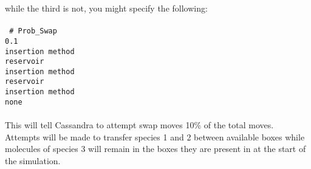 while the third is not, you might specify the following: \\ \\
%
\texttt{ \# Prob\_Swap\\
0.1 \\ 
insertion method \\
reservoir \\
insertion method \\
reservoir \\
insertion method \\
none \\ \\
}
%
This will tell Cassandra to attempt swap moves 10\% of the total moves. Attempts will be made to transfer species 1 and 2 between available boxes while molecules of species 3 will remain
in the boxes they are present in at the start of the simulation. \\ \\
%
%
%

